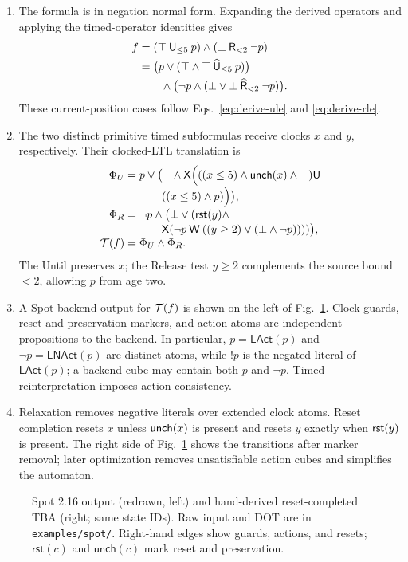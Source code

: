 \begin{enumerate}[label=Step~\arabic*:,leftmargin=*]
\item The formula is in negation normal form. Expanding the derived operators
and applying the timed-operator identities gives
\[
\begin{aligned}
f
 &= (\top\mathbin{\mathsf{U}}_{\le5}p)\land(\bot\mathbin{\mathsf{R}}_{<2}\neg p)\\
 &= \bigl(p\lor(\top\land\top\mathbin{\widehat{\mathsf{U}}}_{\le5}p)\bigr)\\
 &\qquad\land\bigl(\neg p\land(\bot\lor\bot\mathbin{\widehat{\mathsf{R}}}_{<2}\neg p)\bigr).
\end{aligned}
\]
These current-position cases follow Eqs.~\eqref{eq:derive-ule} and
\eqref{eq:derive-rle}.

\item The two distinct primitive timed subformulas receive clocks $x$ and
$y$, respectively. Their clocked-LTL translation is
\begin{align*}
\Phi_U={}&p\lor\bigl(\top\land\mathsf{X}\Bigl(
  ((x\le5)\land\mathsf{unch}(x)\land\top)\mathbin{\mathsf{U}}\\[-1mm]
&\qquad((x\le5)\land p)\Bigr)\bigr),\\[-1mm]
\Phi_R={}&\neg p\land\bigl(\bot\lor(\mathsf{rst}(y)\land\\[-1mm]
&\qquad\mathsf{X}(\neg p\mathbin{\mathsf{W}}((y\ge2)\lor(\bot\land\neg p))))\bigr),\\[-1mm]
\mathcal{T}(f)={}&\Phi_U\land\Phi_R.
\end{align*}
The Until preserves $x$; the Release test $y\ge2$ complements the source
bound $<2$, allowing $p$ from age two.

\item A Spot backend output for $\mathcal{T}(f)$ is shown on the left of
Fig.~\ref{fig:translation-steps45}. Clock guards, reset and preservation
markers, and action atoms are independent propositions to the backend. In
particular, $p=\mathsf{LAct}(p)$ and $\neg p=\mathsf{LNAct}(p)$ are distinct
atoms, while $!p$ is the negated literal of $\mathsf{LAct}(p)$; a backend cube
may contain both $p$ and $\neg p$. Timed reinterpretation imposes action
consistency.

\item Relaxation removes negative literals over extended clock atoms. Reset
completion resets $x$ unless $\mathsf{unch}(x)$ is present and resets $y$ exactly when
$\mathsf{rst}(y)$ is present. The right side of Fig.~\ref{fig:translation-steps45}
shows the transitions after marker removal; later optimization removes
unsatisfiable action cubes and simplifies the automaton.
\end{enumerate}

\begin{figure}[!t]
\centering
\resizebox{\textwidth}{!}{}
\caption{Spot 2.16 output (redrawn, left) and hand-derived reset-completed
TBA (right; same state IDs). Raw input and DOT are in
\texttt{examples/spot/}. Right-hand edges show guards, actions, and resets;
$\mathsf{rst}(c)$ and $\mathsf{unch}(c)$ mark reset and preservation.}
\label{fig:translation-steps45}
\end{figure}
